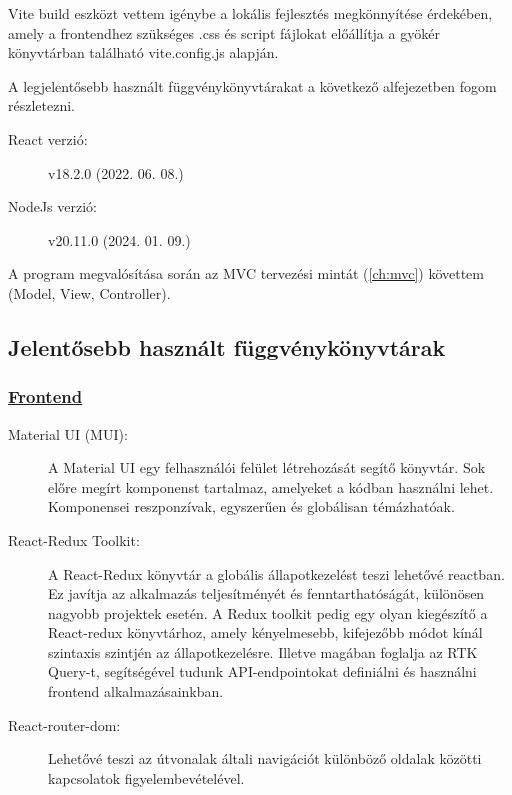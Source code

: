\bigskip

Vite build eszközt vettem igénybe a lokális fejlesztés megkönnyítése érdekében, amely a frontendhez szükséges .css és script fájlokat előállítja a gyökér könyvtárban található vite.config.js alapján.

\bigskip

A legjelentősebb használt függvénykönyvtárakat a következő alfejezetben fogom részletezni.

\bigskip

\begin{description}
	\item[React verzió:] v18.2.0 (2022. 06. 08.)
	\item[NodeJs verzió:] v20.11.0 (2024. 01. 09.)
\end{description}

\bigskip

A program megvalósítása során az MVC tervezési mintát (\ref{ch:mvc}) követtem (Model, View, Controller).


\subsection{Jelentősebb használt függvénykönyvtárak}

\subsubsection{\underline{Frontend}}

\begin{description}
	\item[Material UI (MUI): \cite{materialui}] A Material UI egy felhasználói felület létrehozását segítő könyvtár. Sok előre megírt komponenst tartalmaz, amelyeket a kódban használni lehet. Komponensei reszponzívak, egyszerűen és globálisan témázhatóak.
	\item[React-Redux Toolkit: \cite{reactredux}] A React-Redux könyvtár a globális állapotkezelést teszi lehetővé reactban. Ez javítja az alkalmazás teljesítményét és fenntarthatóságát, különösen nagyobb projektek esetén. A Redux toolkit pedig egy olyan kiegészítő a React-redux könyvtárhoz, amely kényelmesebb, kifejezőbb módot kínál szintaxis szintjén az állapotkezelésre. Illetve magában foglalja az RTK Query-t, segítségével tudunk API-endpointokat definiálni és használni frontend alkalmazásainkban. 
	\item[React-router-dom: \cite{reactrouterdom}] Lehetővé teszi az útvonalak általi navigációt különböző oldalak közötti kapcsolatok figyelembevételével.
\end{description}

